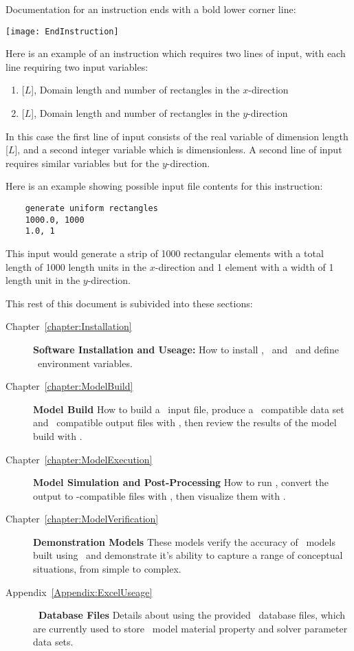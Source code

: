 Documentation for an instruction ends with a bold lower corner line:

  \texttt{[image: EndInstruction]}

Here is an example of an instruction which requires two lines of input, with each line requiring two input variables:

    {
    \squish
    \begin{enumerate}
    \item {}[$L$],   Domain length and number of rectangles in the $x$-direction
    \item {}[$L$],   Domain length and number of rectangles in the $y$-direction
    \end{enumerate}
    \squish
    }

In this case the first line of input consists of the real variable  of dimension length [$L$], and a second integer variable  which is dimensionless.  A second line of input requires similar variables but for the $y$-direction.

Here is an example showing possible input file contents for this instruction:
\begin{verbatim}
    generate uniform rectangles
    1000.0, 1000
    1.0, 1
\end{verbatim}
This input would generate a strip of 1000 rectangular elements with a total length of 1000 length units in the $x$-direction and 1 element with a width of 1 length unit in the $y$-direction.


This rest of this document is subivided into these sections:
\begin{description}
    \item[Chapter~\ref{chapter:Installation}]\textbf{Software Installation and Useage:} How to install \mut, \mfus\ and \tecplot\ and define \windows\ environment variables.
     \item[Chapter~\ref{chapter:ModelBuild}]\textbf{Model Build} How to build a \mut\ input file, produce a \mfus\ compatible data set and \tecplot\ compatible output files with \mut, then review the results of the model build with \tecplot.
    \item[Chapter~\ref{chapter:ModelExecution}]\textbf{Model Simulation and Post-Processing} How to run \mfus, convert the output to \tecplot-compatible files with \mut, then visualize them with \tecplot.
    \item[Chapter~\ref{chapter:ModelVerification}]\textbf{Demonstration Models} These models verify the accuracy of \mfus\ models built using \mut\ and demonstrate it's ability to capture a range of conceptual situations, from simple to complex.
    \item[Appendix~\ref{Appendix:ExcelUseage}]\textbf{\excel\ Database Files} Details about using the provided \excel\ database files, which are currently used to store \mfus\ model material property and solver parameter data sets.
        \end{description}

